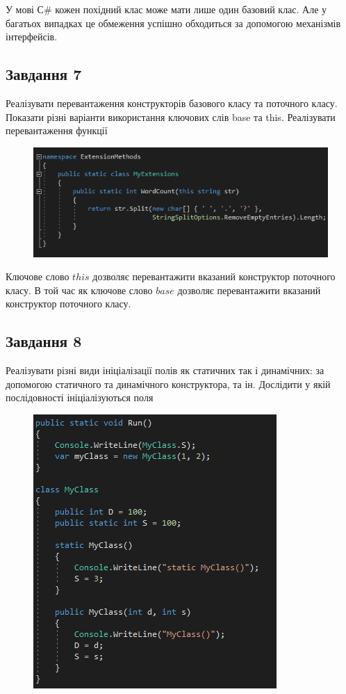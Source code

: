 \documentclass[oneside,14pt]{extarticle}
\begin{document}
\begin{normalsize}
	У мові С\# кожен похідний клас може мати лише один базовий клас. Але у багатьох
	випадках це обмеження успішно обходиться за допомогою механізмів інтерфейсів.
	
	\subsection*{Завдання 7}
	Реалізувати перевантаження конструкторів базового класу та поточного класу.
	Показати різні варіанти використання ключових слів base та this. Реалізувати
	перевантаження функції
	\begin{figure}[H]
		\centering
		\includegraphics[scale=0.7]{17}
	\end{figure}
	
	Ключове слово $this$ дозволяє перевантажити вказаний конструктор поточного класу. В той час як ключове слово $base$ дозволяє перевантажити вказаний конструктор поточного класу.
	
	\subsection*{Завдання 8}
	Реалізувати різні види ініціалізації полів як статичних так і динамічних: за
	допомогою статичного та динамічного конструктора, та ін. Дослідити у якій
	послідовності ініціалізуються поля
	\begin{figure}[H]
		\centering
		\includegraphics[scale=0.7]{18}
	\end{figure}
	

\end{normalsize}
\end{document}
